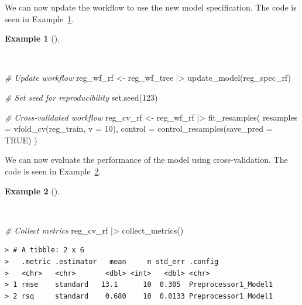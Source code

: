 \documentclass[
  letterpaper,
  DIV=11,
  numbers=noendperiod]{scrreprt}
\newenvironment{Shaded}{\begin{snugshade}}{\end{snugshade}}
\newcommand{\AttributeTok}[1]{\textcolor[rgb]{0.00,0.00,0.00}{#1}}
\newcommand{\CommentTok}[1]{\textcolor[rgb]{0.00,0.00,0.00}{\textit{#1}}}
\newcommand{\ConstantTok}[1]{\textcolor[rgb]{0.00,0.00,0.00}{#1}}
\newcommand{\DecValTok}[1]{\textcolor[rgb]{0.00,0.00,0.00}{#1}}
\newcommand{\FunctionTok}[1]{\textcolor[rgb]{0.00,0.00,0.00}{#1}}
\newcommand{\NormalTok}[1]{\textcolor[rgb]{0.00,0.00,0.00}{#1}}
\newcommand{\OtherTok}[1]{\textcolor[rgb]{0.00,0.00,0.00}{#1}}
\newcommand{\SpecialCharTok}[1]{\textcolor[rgb]{0.00,0.00,0.00}{#1}}
\theoremstyle{definition}
\newtheorem{example}{Example}[chapter]
\theoremstyle{remark}
\begin{document}
We can now update the workflow to use the new model specification. The
code is seen in
Example~\ref{exm-pda-reg-model-spec-random-forest-workflow}.

\begin{example}[]\protect\hypertarget{exm-pda-reg-model-spec-random-forest-workflow}{}\label{exm-pda-reg-model-spec-random-forest-workflow}

~

\begin{Shaded}
\begin{Highlighting}[]
\CommentTok{\# Update workflow}
\NormalTok{reg\_wf\_rf }\OtherTok{\textless{}{-}}
\NormalTok{  reg\_wf\_tree }\SpecialCharTok{|\textgreater{}}
  \FunctionTok{update\_model}\NormalTok{(reg\_spec\_rf)}

\CommentTok{\# Set seed for reproducibility}
\FunctionTok{set.seed}\NormalTok{(}\DecValTok{123}\NormalTok{)}

\CommentTok{\# Cross{-}validated workflow}
\NormalTok{reg\_cv\_rf }\OtherTok{\textless{}{-}}
\NormalTok{  reg\_wf\_rf }\SpecialCharTok{|\textgreater{}}
  \FunctionTok{fit\_resamples}\NormalTok{(}
    \AttributeTok{resamples =} \FunctionTok{vfold\_cv}\NormalTok{(reg\_train, }\AttributeTok{v =} \DecValTok{10}\NormalTok{),}
    \AttributeTok{control =} \FunctionTok{control\_resamples}\NormalTok{(}\AttributeTok{save\_pred =} \ConstantTok{TRUE}\NormalTok{)}
\NormalTok{  )}
\end{Highlighting}
\end{Shaded}

\end{example}

We can now evaluate the performance of the model using cross-validation.
The code is seen in
Example~\ref{exm-pda-reg-model-spec-random-forest-workflow-evaluate}.

\begin{example}[]\protect\hypertarget{exm-pda-reg-model-spec-random-forest-workflow-evaluate}{}\label{exm-pda-reg-model-spec-random-forest-workflow-evaluate}

~

\begin{Shaded}
\begin{Highlighting}[]
\CommentTok{\# Collect metrics}
\NormalTok{reg\_cv\_rf }\SpecialCharTok{|\textgreater{}}
  \FunctionTok{collect\_metrics}\NormalTok{()}
\end{Highlighting}
\end{Shaded}

\begin{verbatim}
> # A tibble: 2 x 6
>   .metric .estimator   mean     n std_err .config             
>   <chr>   <chr>       <dbl> <int>   <dbl> <chr>               
> 1 rmse    standard   13.1      10  0.305  Preprocessor1_Model1
> 2 rsq     standard    0.680    10  0.0133 Preprocessor1_Model1
\end{verbatim}

\end{example}
\end{document}
